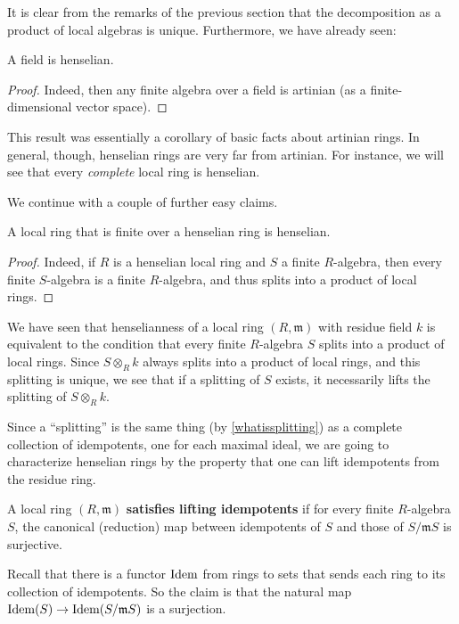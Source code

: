 It is clear from the remarks of the previous section that the 
decomposition as a product of local algebras is unique.
Furthermore, we have already seen:

\begin{proposition} 
A field is henselian. 
\end{proposition}
\begin{proof} 
Indeed, then any finite algebra over a field is artinian (as a
finite-dimensional vector space).
\end{proof} 

This result was essentially a corollary of basic facts about artinian
rings. In general, though, henselian rings are very far from artinian. For
instance, we will see that every \emph{complete} local ring is henselian.

We continue with a couple of further easy claims. 
\begin{proposition}  \label{finitehenselian}
A local ring that is finite over a henselian ring is henselian. 
\end{proposition} 
\begin{proof} 
Indeed, if $R$ is a henselian local ring and $S$ a finite $R$-algebra, then
every finite $S$-algebra is a finite $R$-algebra, and thus splits into a product
of local rings.
\end{proof} 

We have seen that henselianness of a local ring $(R, \mathfrak{m})$ with residue
field $k$ is equivalent to the condition that every finite $R$-algebra $S$ splits
into a product of local rings. Since $S \otimes_R k$ always splits into a
product of local rings, and this splitting is unique, we see that if a splitting
of $S$ exists, it necessarily lifts the splitting of $S \otimes_R k$. 

Since a ``splitting'' is the same thing (by \cref{whatissplitting}) as a
complete collection of idempotents, one for each maximal ideal, we are going to
characterize henselian rings by the property that one can lift idempotents from
the residue ring.

\begin{definition}
A local ring $(R, \mathfrak{m})$ \textbf{satisfies lifting
  idempotents} if for every finite $R$-algebra $S$, the canonical
(reduction) map
between idempotents of $S$ and those of $S/\mathfrak{m}S$ is surjective.
\end{definition}

Recall that there is a functor $\operatorname{\text{Idem}}$ from rings to sets that sends each ring
to its collection of idempotents. So the claim is that the natural map $\operatorname{\text{Idem}}(S)
\to \operatorname{\text{Idem}}(S/\mathfrak{m}S)$ is a surjection.

